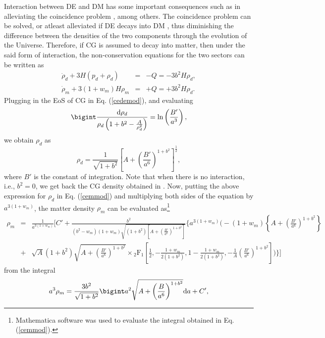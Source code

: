 \documentclass[two-column, nofootinbib]{revtex4-1}
\begin{document}
Interaction between DE and DM has some important consequences such as in alleviating the coincidence problem \cite{Amendola1,Chimento1,Olivares1,Mangano1,Farrar1,Pavon1}, among others. The coincidence problem can be solved, or atleast alleviated if DE decays into DM \cite{Zhang1}, thus diminishing the difference between the densities of the two components through the evolution of the Universe. Therefore, if CG is assumed to decay into matter, then under the said form of interaction, the non-conservation equations for the two sectors can be written as
\begin{eqnarray}
\dot{\rho}_d+3H(p_d+{\rho_d}) &=& -Q = -3b^2H\rho_d, \label{cedemod} \\
\dot{\rho}_m+3(1+w_m)H\rho_m &=& +Q = +3b^2H\rho_d. \label{cemmod}
\end{eqnarray}
Plugging in the EoS of CG in Eq. (\ref{cedemod}), and evaluating
\begin{equation}
\bigint \frac{\text{d}\rho_d}{\rho_d \left(1+b^2-\frac{A}{\rho_{d}^{2}}\right)}=\text{ln}\left(\frac{B'}{a^3}\right), \nonumber
\end{equation} 
we obtain $\rho_d$ as
\begin{equation}
\rho_d = \frac{1}{\sqrt{1+b^2}}\left[A+\left(\frac{B'}{a^6}\right)^{1+b^2}\right]^{\frac{1}{2}}, \label{rhodint}
\end{equation}
where $B'$ is the constant of integration. Note that when there is no interaction, i.e., $b^2=0$, we get back the CG density obtained in \cite{Kamenshchik1}. Now, putting the above expression for $\rho_d$ in Eq. (\ref{cemmod}) and multiplying both sides of the equation by $a^{3(1+w_m)}$, the matter density $\rho _m$ can be evaluated as\footnote{Mathematica software was used to evaluate the integral obtained in Eq. (\ref{cemmod}).}
\begin{eqnarray}
\rho_m &=& \frac{1}{a^{3(1+w_m)}}\Biggl[C'+\frac{b^2}{(b^2-w_m)(1+w_m)\sqrt{(1+b^2)\left[A+\left(\frac{B'}{a^6}\right)^{1+b^2}\right]}}\Bigg\lbrace a^{3(1+w_m)}\Biggl(-(1+w_m) \left\lbrace A+\left(\frac{B'}{a^6}\right)^{1+b^2} \right\rbrace \nonumber \\
&+& \sqrt{A}(1+b^2)\sqrt{A+\left(\frac{B'}{a^6}\right)^{1+b^2}}\times {_2\text{F}_{1}}\left[\frac{1}{2},-\frac{1+w_m}{2(1+b^2)},1-\frac{1+w_m}{2(1+b^2)},-\frac{1}{A}{\left(\frac{B'}{a^6}\right)}^{1+b^2}\right]\Biggr)\Bigg\rbrace \Biggr] \label{rhomint}
\end{eqnarray}
from the integral
\begin{equation}
a^3 \rho_m=\frac{3b^2}{\sqrt{1+b^2}}\bigint a^2\sqrt{A+\left(\frac{B}{a^6}\right)^{1+b^2}}\text{d}a+C', \nonumber
\end{equation}
\end{document}
